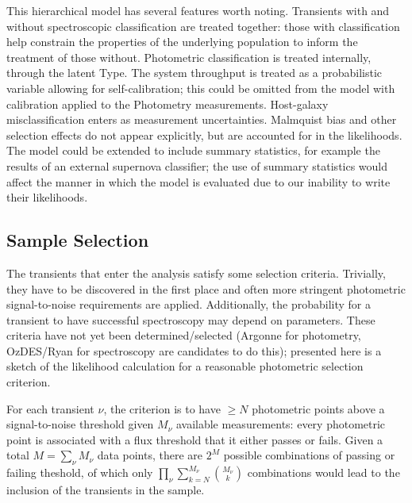 \documentclass[preprint,3p]{elsarticle}
\begin{document}
This hierarchical model has several features worth noting.  Transients with and without
spectroscopic classification are treated together: those with classification help constrain
the properties of the underlying population to inform the treatment of those without.
Photometric classification is treated internally, through the
latent Type.  The system throughput is treated as a probabilistic variable
allowing for self-calibration; this could be omitted from the model with calibration applied
to the Photometry measurements.  Host-galaxy misclassification enters as measurement
uncertainties.  Malmquist bias and other selection effects do not appear explicitly, but are accounted
for in the likelihoods.  The model could be extended to include summary statistics,
for example the results of an external supernova classifier; the use
of summary statistics would affect the manner in which the model is evaluated
due to our inability to write their likelihoods.

\subsection{Sample Selection}
The transients that enter the analysis satisfy some selection criteria.  Trivially, they
have to be discovered in the first place and often more stringent photometric signal-to-noise
requirements are applied.  Additionally, the probability for a transient to have successful
spectroscopy may depend on parameters.
These criteria have not yet been determined/selected
(Argonne for photometry, OzDES/Ryan for spectroscopy are candidates to do this);
presented here is a sketch of the likelihood calculation for a reasonable
photometric selection criterion.

For each transient $\nu$, the criterion is to have $\ge N$ photometric points
above a signal-to-noise threshold given $M_\nu$ available measurements:
every photometric point is associated with a flux threshold that it either passes
or fails.  Given a total $M=\sum_\nu M_\nu$ data points, there are
$2^M$ possible combinations
of passing or failing theshold, of which only
$\prod_\nu \sum_{k=N}^{M_{\nu}} \binom{M_{\nu}}{k}$  combinations would lead to
the inclusion of the transients in the sample.
\end{document}
